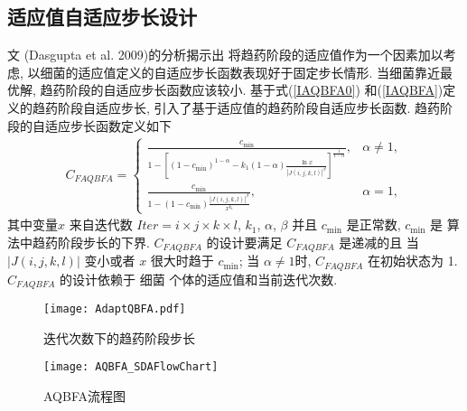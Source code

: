 \subsection{适应值自适应步长设计}
文 (Dasgupta et al. 2009)的分析揭示出 将趋药阶段的适应值作为一个因素加以考虑, 以细菌的适应值定义的自适应步长函数表现好于固定步长情形.
当细菌靠近最优解, 趋药阶段的自适应步长函数应该较小. 基于式(\ref{IAQBFA0}) 和(\ref{IAQBFA})定义的趋药阶段自适应步长, 引入了基于适应值的趋药阶段自适应步长函数.
趋药阶段的自适应步长函数定义如下
\begin{align}\label{FAQBFA}
C_{FAQBFA}
 =
\left\{
  \begin{array}{ll}
  \frac{c_{\min}}{1-\left[(1-c_{\min})^{1-\alpha}-k_1(1-\alpha)\frac{\ln x}{|J(i,j,k,l)|^{\beta}}\right]^{\frac{1}{1-\alpha}}},&  \alpha\neq 1,\\
  \frac{c_{\min}}{1-(1-c_{\min})\frac{|J(i,j,k,l)|^{\beta}}{x^{k_1}}},&  \alpha= 1,
  \end{array}
  \right.
\end{align}
其中变量$x$ 来自迭代数 $Iter=i\times j\times k \times l$, $k_1$, $\alpha$, $\beta$ 并且 $c_{\min}$ 是正常数, $c_{\min}$ 是 算法中趋药阶段步长的下界.
$C_{FAQBFA}$ 的设计要满足 $C_{FAQBFA}$ 是递减的且 当 $|J(i,j,k,l)|$ 变小或者 $x$ 很大时趋于 $c_{\min}$;
当 $\alpha\neq 1$时, $C_{FAQBFA}$ 在初始状态为 1. $C_{FAQBFA}$ 的设计依赖于 细菌 个体的适应值和当前迭代次数.
\begin{figure}[!tbp]
\begin{center}
    \texttt{[image: AdaptQBFA.pdf]}
    \caption{迭代次数下的趋药阶段步长}
    \label{AdaptQBFA:fig1}
    \vspace{-0.5em}
\end{center}
\end{figure}
\begin{figure*}[tb]
    \begin{center}
     \texttt{[image: AQBFA\_SDAFlowChart]}
      \caption{AQBFA流程图}
      \label{fig:FlowchartAQBFA}
      \vspace{-0.4cm}
    \end{center}
\end{figure*}
